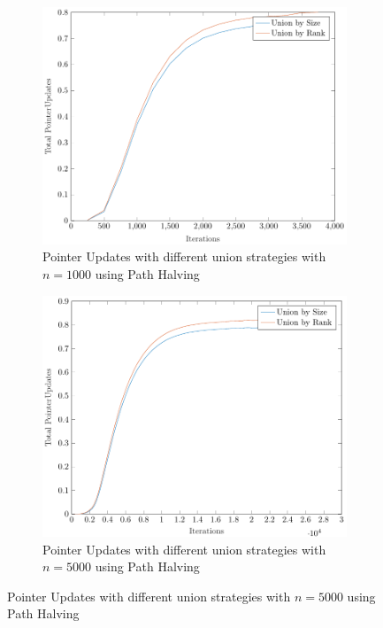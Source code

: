 \begin{figure}[ht]
    \begin{subfigure}{0.32\textwidth}
        \centering
        \includegraphics[width=\textwidth]{../images/plotPHNonFull1000_PointerUpdates.pdf}
        \caption{Pointer Updates with different union strategies with $n = 1000$ using Path Halving}
    \end{subfigure}%
    \hfill
    \begin{subfigure}{0.32\textwidth}
        \centering
        \includegraphics[width=\textwidth]{../images/plotPHNonFull5000_PointerUpdates.pdf}
        \caption{Pointer Updates with different union strategies with $n = 5000$ using Path Halving}

\end{subfigure}
\end{figure}
